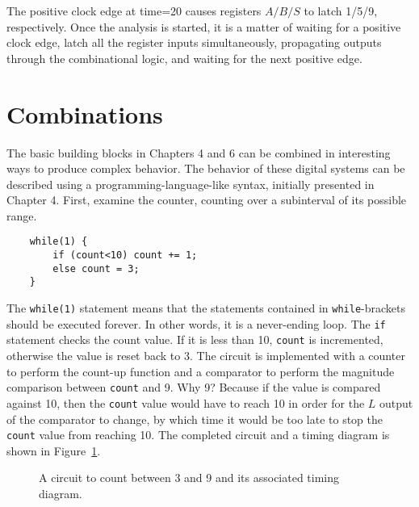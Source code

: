 The positive clock edge at time=20 causes registers $A/B/S$ to latch 1/5/9, 
respectively.  Once the analysis is started, it is a matter of waiting for a 
positive clock edge, latch all the register inputs simultaneously, propagating 
outputs through the combinational logic, and waiting for the next positive edge.
                                                                                


\section{Combinations}
The basic building blocks in Chapters 4 and 6 can be combined in interesting ways
to produce complex behavior.  The behavior of these digital systems can be described 
using a programming-language-like syntax, initially presented in Chapter 4. First, examine
the counter, counting over a subinterval of its possible range.

\begin{verbatim}
    while(1) {
        if (count<10) count += 1;
        else count = 3;
    }
\end{verbatim}

The \verb+while(1)+ statement means that the statements contained 
in \verb+while+-brackets should be executed forever.  In other 
words, it is a never-ending loop.  The \verb+if+ statement checks 
the count value. If it is less than 10, \verb+count+ is incremented, 
otherwise the value is reset back to 3. The circuit is implemented 
with a counter to perform the count-up function and a comparator 
to perform the magnitude comparison between \verb+count+ and 9.  
Why 9?  Because if the value is compared against 10, then the 
\verb+count+ value would have to reach 10 in order for the $L$ 
output of the comparator to change, by which time it would be too 
late to stop the \verb+count+ value from reaching 10.  The completed 
circuit and a timing diagram is shown in Figure~\ref{fig:sequentialBBcomb1}.

\begin{figure}[ht]
\caption{A circuit to count between 3 and 9 and its associated timing diagram.}
\label{fig:sequentialBBcomb1}

\end{figure}

